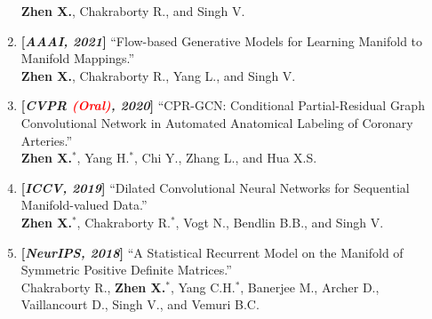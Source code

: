 \documentclass[margin]{res}
\begin{document}
\begin{resume}
\begin{enumerate}[noitemsep,wide=0pt,leftmargin=\dimexpr\labelwidth + 2\labelsep\relax]
                            \textbf{Zhen X.}, Chakraborty R., and Singh V. 
                \item \textbf{[\emph{AAAI, 2021}]} ``Flow-based Generative Models for Learning Manifold to Manifold Mappings.''\\
                            \textbf{Zhen X.}, Chakraborty R., Yang L., and Singh V. 
                \item \textbf{[\emph{CVPR \textcolor{red}{(Oral)}, 2020}]} ``CPR-GCN: Conditional Partial-Residual Graph Convolutional Network in Automated Anatomical Labeling of Coronary Arteries.''\\
                            \textbf{Zhen X.}$^*$, Yang H.$^*$, Chi Y., Zhang L., and Hua X.S.   
                \item \textbf{[\emph{ICCV, 2019}]} ``Dilated Convolutional Neural Networks for Sequential Manifold-valued Data.'' \\
                             \textbf{Zhen X.}$^*$, Chakraborty R.$^*$, Vogt N., Bendlin B.B., and Singh V. 
                \item \textbf{[\emph{NeurIPS, 2018}]} ``A Statistical Recurrent Model on the Manifold of Symmetric Positive Definite Matrices.''\\
                             Chakraborty R., \textbf{Zhen X.}$^*$, Yang C.H.$^*$, Banerjee M., Archer D., Vaillancourt D., Singh V., and Vemuri B.C.
                \end{enumerate}

\vspace{-1em}

\end{resume}
\end{document}

